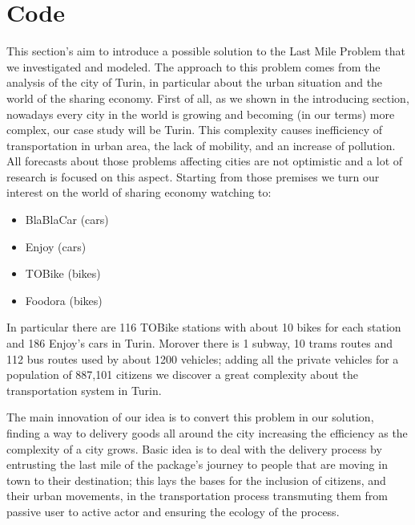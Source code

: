 \documentclass[11pt,a4paper]{article}
\begin{document}
\newpage 
\section{Code}
This section's aim to introduce a possible solution to the Last Mile Problem that we investigated and modeled. 
The approach to this problem comes from the analysis of the city of Turin, in particular about the urban situation and the world of the sharing economy. 
First of all, as we shown in the introducing section, nowadays every city in the world is growing and becoming (in our terms) more complex, our case study will be Turin. 
This complexity causes inefficiency of transportation in urban area, the lack of mobility, and an increase of pollution. 
All forecasts about those problems  affecting cities are not optimistic and a lot of research is focused on this aspect. 
Starting from those premises we turn our interest on the world of sharing economy watching to:
\begin{center}
\begin{itemize}
\item BlaBlaCar (cars)
\item Enjoy (cars)
\item TOBike (bikes)
\item Foodora (bikes)
\end{itemize}
\end{center}
In particular there are 116 TOBike stations with about 10 bikes for each station and 186 Enjoy's cars in Turin. 
Morover there is 1 subway, 10 trams routes and 112 bus routes used by about 1200 vehicles; adding all the private vehicles for a population of 887,101 citizens we discover a great complexity about the transportation system in Turin. 

The main innovation of our idea is to convert this problem in our solution, finding a way to delivery goods all around the city increasing the efficiency as the complexity of a city grows. 
Basic idea is to deal with the delivery process by entrusting the last mile of the package's journey to people that are moving in town to their destination; this lays the bases for the inclusion of citizens, and their urban movements, in the transportation process transmuting them from passive user to active actor and ensuring the ecology of the process. 
\end{document}

